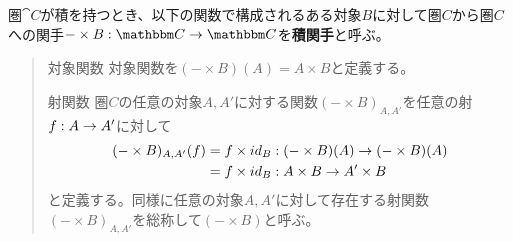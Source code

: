 	\begin{define}[積関手]\label{def-product-functor}
		圏$\cat{C}$が積を持つとき、以下の関数で構成されるある対象$B$に対して圏$C$から圏$C$への関手$\functor{-\times B}{C}{C}$を\textbf{積関手}と呼ぶ。
		\begin{quote}
			\begin{mydescription}
			\item[対象関数] 対象関数を$(-\times B)(A)=A\times B$と定義する。
			\item[射関数] 圏$C$の任意の対象$A,A'$に対する関数$(-\times B)_{A,A'}$を任意の射$f:A\rightarrow A'$に対して
			\begin{align*}
				(-\times B)_{A,A'}(f)&=f\times id_B:(-\times B)(A)\rightarrow (-\times B)(A)\\
				&=f\times id_B:A\times B\rightarrow A'\times B
			\end{align*}
			と定義する。同様に任意の対象$A,A'$に対して存在する射関数$(-\times B)_{A,A'}$を総称して$(-\times B)$と呼ぶ。
			\begin{center}
\end{center}
\end{mydescription}
\end{quote}
\end{define}
